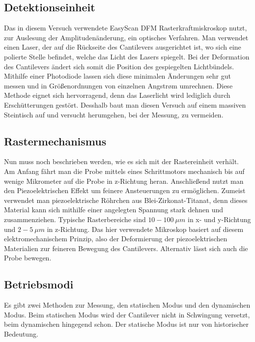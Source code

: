  \subsection{Detektionseinheit}
 
 Das in diesem Versuch verwendete EasyScan DFM Rasterkraftmiskroskop nutzt, zur Auslesung der Amplitudenänderung, ein optisches Verfahren. 
 Man verwendet einen Laser, der auf die Rückseite des Cantilevers ausgerichtet ist, wo sich eine polierte Stelle befindet, welche das Licht des Lasers spiegelt.
 Bei der Deformation des Cantilevers ändert sich somit die Position des gespiegelten Lichtbündels.
 Mithilfe einer Photodiode lassen sich diese minimalen Änderungen sehr gut messen und in Größenordnungen von einzelnen Angstrøm umrechnen.
 Diese Methode eignet sich hervorragend, denn das Laserlicht wird lediglich durch Erschütterungen gestört.
 Desshalb baut man diesen Versuch auf einem massiven Steintisch auf und versucht herumgehen, bei der Messung, zu vermeiden.

\subsection{Rastermechanismus}

Nun muss noch beschrieben werden, wie es sich mit der Rastereinheit verhält.
Am Anfang fährt man die Probe mittels eines Schrittmotors mechanisch bis auf wenige Mikrometer auf die Probe in z-Richtung heran.
Anschließend nutzt man den Piezoelektrischen Effekt um feinere Ansteuerungen zu ermöglichen.
Zumeist verwendet man piezoelektrische Röhrchen aus Blei-Zirkonat-Titanat, denn dieses Material kann sich mithilfe einer angelegten Spannung stark dehnen und zusammenziehen. 
Typische Rasterbereiche sind $10-\SI{100}{\mu m}$ in x- und y-Richtung und $2-\SI{5}{\mu m}$ in z-Richtung.
Das hier verwendete Mikroskop basiert auf diesem elektromechanischem Prinzip, also der Deformierung der piezoelektrischen Materialien zur feineren Bewegung des Cantilevers.
Alternativ lässt sich auch die Probe bewegen.

\subsection{Betriebsmodi}

Es gibt zwei Methoden zur Messung, den statischen Modus und den dynamischen Modus. Beim statischen Modus wird der Cantilever nicht in Schwingung versetzt, beim dynamischen hingegend schon. Der statische Modus ist nur von historischer Bedeutung.

